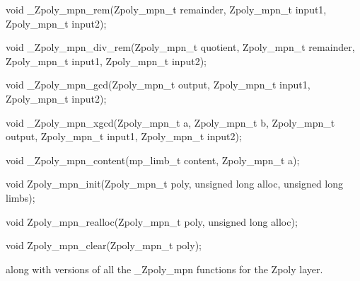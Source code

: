 \documentclass[a4paper,10pt]{article}
\begin{document}
void \_Zpoly\_mpn\_rem(Zpoly\_mpn\_t remainder, Zpoly\_mpn\_t input1, Zpoly\_mpn\_t input2);

void \_Zpoly\_mpn\_div\_rem(Zpoly\_mpn\_t quotient, Zpoly\_mpn\_t remainder, Zpoly\_mpn\_t input1, Zpoly\_mpn\_t input2);

void \_Zpoly\_mpn\_gcd(Zpoly\_mpn\_t output, Zpoly\_mpn\_t input1, Zpoly\_mpn\_t input2);

void \_Zpoly\_mpn\_xgcd(Zpoly\_mpn\_t a, Zpoly\_mpn\_t b, Zpoly\_mpn\_t output, Zpoly\_mpn\_t input1, Zpoly\_mpn\_t input2);

void \_Zpoly\_mpn\_content(mp\_limb\_t \* content, Zpoly\_mpn\_t a);

\vspace{10mm}

void Zpoly\_mpn\_init(Zpoly\_mpn\_t poly, unsigned long alloc, unsigned long limbs);
                                              
void Zpoly\_mpn\_realloc(Zpoly\_mpn\_t poly, unsigned long alloc);

void Zpoly\_mpn\_clear(Zpoly\_mpn\_t poly);

\vspace{5mm}

along with versions of all the \_Zpoly\_mpn functions for the Zpoly layer.
\end{document}
